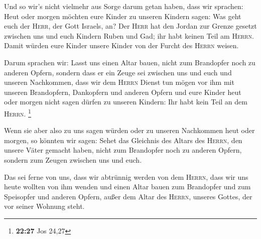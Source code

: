  Und so wir's nicht vielmehr aus Sorge darum getan haben,
dass wir sprachen: Heut oder morgen möchten eure Kinder zu unseren
Kindern sagen: Was geht euch der \textsc{Herr}, der Gott Israels, an?
 Der \textsc{Herr} hat den Jordan zur Grenze gesetzt
zwischen uns und euch Kindern Ruben und Gad; ihr habt keinen Teil am
\textsc{Herrn}. Damit würden eure Kinder unsere Kinder von der Furcht
des \textsc{Herrn} weisen.

 Darum sprachen wir: Lasst uns einen Altar bauen, nicht
zum Brandopfer noch zu anderen Opfern,  sondern dass er
ein Zeuge sei zwischen uns und euch und unseren Nachkommen, dass wir dem
\textsc{Herrn} Dienst tun mögen vor ihm mit unseren Brandopfern,
Dankopfern und anderen Opfern und eure Kinder heut oder morgen nicht
sagen dürfen zu unseren Kindern: Ihr habt kein Teil an dem
\textsc{Herrn}. \footnote{\textbf{22:27} Jos 24,27}

 Wenn sie aber also zu uns sagen würden oder zu unseren
Nachkommen heut oder morgen, so könnten wir sagen: Sehet das Gleichnis
des Altars des \textsc{Herrn}, den unsere Väter gemacht haben, nicht zum
Brandopfer noch zu anderen Opfern, sondern zum Zeugen zwischen uns und
euch.

 Das sei ferne von uns, dass wir abtrünnig werden von dem
\textsc{Herrn}, dass wir uns heute wollten von ihm wenden und einen
Altar bauen zum Brandopfer und zum Speisopfer und anderen Opfern, außer
dem Altar des \textsc{Herrn}, unseres Gottes, der vor seiner Wohnung
steht.

